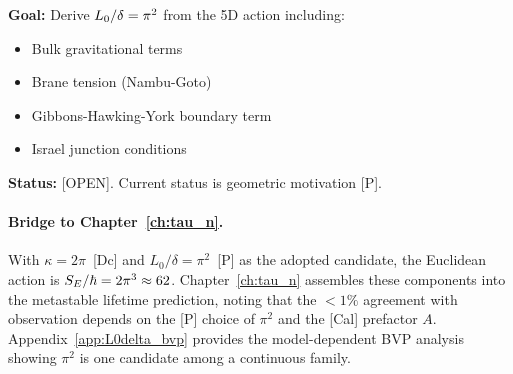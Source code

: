 \begin{edcopenbox}[title=Open Problem: Rigorous Derivation]
    \textbf{Goal:} Derive $L_0/\delta = \pi^2$ from the 5D action including:
    \begin{itemize}
        \item Bulk gravitational terms
        \item Brane tension (Nambu-Goto)
        \item Gibbons-Hawking-York boundary term
        \item Israel junction conditions
    \end{itemize}

    \textbf{Status:} [OPEN]. Current status is geometric motivation [P].
    \tagOpen
\end{edcopenbox}

\paragraph{Bridge to Chapter~\ref{ch:tau_n}.}
With $\kappa = 2\pi$~[Dc] and $L_0/\delta = \pi^2$~[P] as the adopted
candidate, the Euclidean action is $S_E/\hbar = 2\pi^3 \approx 62$.
Chapter~\ref{ch:tau_n} assembles these components into the metastable
lifetime prediction, noting that the $< 1\%$ agreement with observation
depends on the [P] choice of $\pi^2$ and the [Cal] prefactor $A$.
Appendix~\ref{app:L0delta_bvp} provides the model-dependent BVP analysis
showing $\pi^2$ is one candidate among a continuous family.

